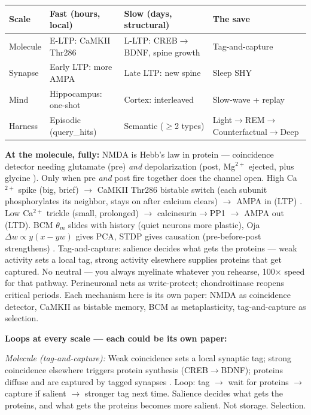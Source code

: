 \documentclass[11pt]{article}
\begin{document}
\begin{center}
\small
\begin{tabular}{p{2.4cm}p{3.8cm}p{3.8cm}p{2.8cm}}
\toprule
Scale & Fast (hours, local) & Slow (days, structural) & The save \\
\midrule
Molecule & E-LTP: CaMKII Thr286 & L-LTP: CREB$\to$BDNF, spine growth & Tag-and-capture \\
Synapse & Early LTP: more AMPA & Late LTP: new spine & Sleep SHY \\
Mind & Hippocampus: one-shot & Cortex: interleaved & Slow-wave + replay \\
Harness & Episodic (query\_hits) & Semantic ($\geq$2 types) & Light$\to$REM$\to$Counterfactual$\to$Deep \\
\bottomrule
\end{tabular}
\end{center}

\textbf{At the molecule, fully:} NMDA is Hebb's law in protein --- coincidence detector needing glutamate (pre) \emph{and} depolarization (post, Mg$^{2+}$ ejected, plus glycine \citep{tononi2014}). Only when pre \emph{and} post fire together does the channel open. High Ca$^{2+}$ spike (big, brief) $\to$ CaMKII Thr286 bistable switch (each subunit phosphorylates its neighbor, stays on after calcium clears) $\to$ AMPA in (LTP) \citep{tononi2014}. Low Ca$^{2+}$ trickle (small, prolonged) $\to$ calcineurin$\to$PP1 $\to$ AMPA out (LTD). BCM $\theta_m$ slides with history (quiet neurons more plastic), Oja $\Delta w \propto y(x - yw)$ gives PCA, STDP gives causation (pre-before-post strengthens) \citep{tononi2014}. Tag-and-capture: salience decides what gets the proteins --- weak activity sets a local tag, strong activity elsewhere supplies proteins that get captured. No neutral --- you always myelinate whatever you rehearse, 100$\times$ speed for that pathway. Perineuronal nets as write-protect; chondroitinase reopens critical periods. Each mechanism here is its own paper: NMDA as coincidence detector, CaMKII as bistable memory, BCM as metaplasticity, tag-and-capture as selection.

\textbf{Loops at every scale --- each could be its own paper:}

\textit{Molecule (tag-and-capture):} Weak coincidence sets a local synaptic tag; strong coincidence elsewhere triggers protein synthesis (CREB$\to$BDNF); proteins diffuse and are captured by tagged synapses \citep{tononi2014}. Loop: tag $\to$ wait for proteins $\to$ capture if salient $\to$ stronger tag next time. Salience decides what gets the proteins, and what gets the proteins becomes more salient. Not storage. Selection.
\end{document}
